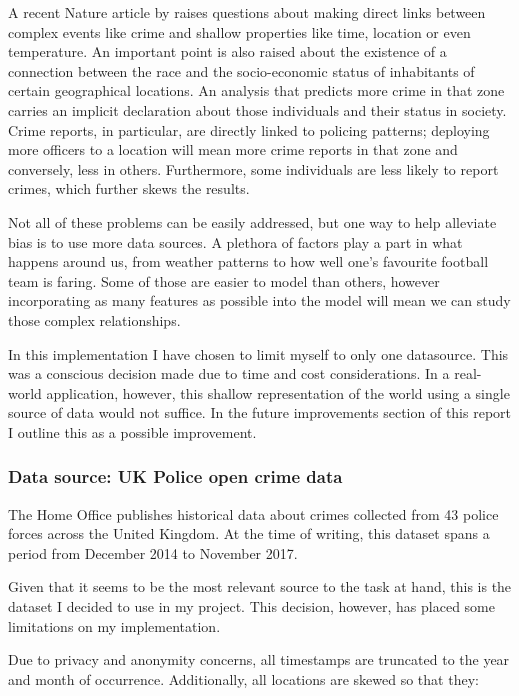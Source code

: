 \documentclass{article}
\begin{document}
	A recent Nature article by \cite{shapiro} raises questions about making direct links between complex events like crime and shallow properties like time, location or even temperature. An important point is also raised about the existence of a connection between the race and the socio-economic status of inhabitants of certain geographical locations. An analysis that predicts more crime in that zone carries an implicit declaration about those individuals and their status in society. Crime reports, in particular, are directly linked to policing patterns; deploying more officers to a location will mean more crime reports in that zone and conversely, less in others. Furthermore, some individuals are less likely to report crimes, which further skews the results.

	Not all of these problems can be easily addressed, but one way to help alleviate bias is to use more data sources. A plethora of factors play a part in what happens around us, from weather patterns to how well one's favourite football team is faring. Some of those are easier to model than others, however incorporating as many features as possible into the model will mean we can study those complex relationships.

	In this implementation I have chosen to limit myself to only one datasource. This was a conscious decision made due to time and cost considerations. In a real-world application, however, this shallow representation of the world using a single source of data would not suffice. In the future improvements section of this report I outline this as a possible improvement.

	\subsubsection{Data source: UK Police open crime data}

	The Home Office publishes historical data about crimes collected from 43 police forces across the United Kingdom. At the time of writing, this dataset spans a period from December 2014 to November 2017.

	Given that it seems to be the most relevant source to the task at hand, this is the dataset I decided to use in my project. This decision, however, has placed some limitations on my implementation.

	Due to privacy and anonymity concerns, all timestamps are truncated to the year and month of occurrence. Additionally, all locations are skewed so that they:
\end{document}
